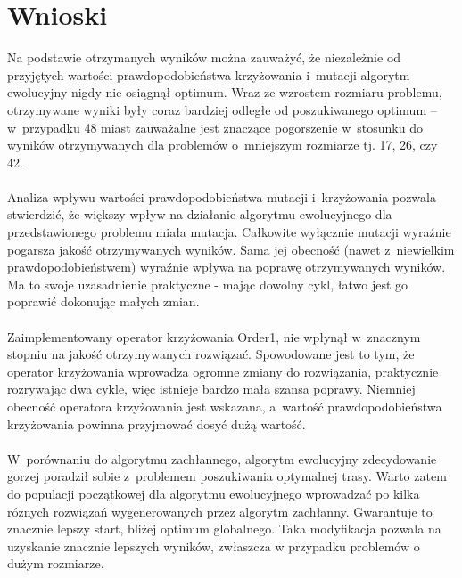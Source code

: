 \documentclass[12pt, a4paper]{article}
\begin{document}
\section{Wnioski}
Na podstawie otrzymanych wyników można zauważyć, że niezależnie od przyjętych wartości 
prawdopodobieństwa krzyżowania i~mutacji algorytm ewolucyjny nigdy nie osiągnął optimum.
 Wraz ze wzrostem rozmiaru problemu, otrzymywane wyniki były coraz bardziej odległe od 
poszukiwanego optimum -- w~przypadku 48 miast zauważalne jest znaczące pogorszenie w~stosunku 
do wyników otrzymywanych dla problemów o~mniejszym rozmiarze tj. 17, 26, czy 42.\\
\\
Analiza wpływu wartości prawdopodobieństwa mutacji i~krzyżowania pozwala stwierdzić, 
że większy wpływ na działanie algorytmu ewolucyjnego dla przedstawionego problemu miała mutacja. 
Całkowite wyłącznie mutacji wyraźnie pogarsza jakość otrzymywanych wyników. 
Sama jej obecność (nawet z~niewielkim prawdopodobieństwem) wyraźnie wpływa na poprawę 
otrzymywanych wyników. Ma to swoje uzasadnienie praktyczne - mając dowolny cykl, łatwo
jest go poprawić dokonując małych zmian.\\
\\
Zaimplementowany operator krzyżowania Order1, nie wpłynął w~znacznym 
stopniu na jakość otrzymywanych rozwiązać. Spowodowane jest to tym, że
operator krzyżowania wprowadza ogromne zmiany do rozwiązania, praktycznie rozrywając dwa cykle, 
więc istnieje bardzo mała szansa poprawy. Niemniej obecność operatora krzyżowania jest wskazana, 
a~wartość prawdopodobieństwa krzyżowania powinna przyjmować dosyć dużą wartość.\\
\\
W~porównaniu do algorytmu zachłannego, algorytm ewolucyjny zdecydowanie gorzej poradził sobie 
z~problemem poszukiwania optymalnej trasy. Warto zatem do populacji początkowej dla algorytmu ewolucyjnego
wprowadzać po kilka różnych rozwiązań wygenerowanych przez algorytm zachłanny. Gwarantuje to znacznie lepszy
start, bliżej optimum globalnego. Taka modyfikacja pozwala na uzyskanie znacznie lepszych wyników, zwłaszcza w przypadku problemów o dużym rozmiarze.

\nocite{*}


\end{document}
